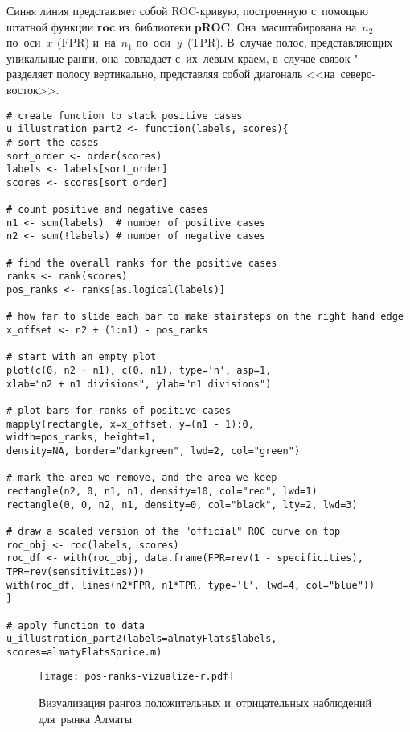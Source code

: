 \documentclass[]{scrreprt}
\begin{document}
Синяя линия представляет собой ROC-кривую, построенную с~помощью штатной функции \textbf{roc} из~библиотеки \textbf{pROC}. Она~масштабирована на~$n_{2}$ по~оси~\textit{x}~(FPR) и~на~$n_{1}$ по~оси~\textit{y}~(TPR). В~случае полос, представляющих уникальные ранги, она~совпадает с~их~левым краем, в~случае связок "--- разделяет полосу вертикально, представляя собой диагональ <<на~северо-восток>>.
%
\begin{lstlisting}[float, caption = Визуализация рангов положительных наблюдений для~рынка Алматы, firstnumber=1, label= lst:vizualize-pos-cases-almaty-R]
# create function to stack positive cases
u_illustration_part2 <- function(labels, scores){
# sort the cases
sort_order <- order(scores)
labels <- labels[sort_order]
scores <- scores[sort_order]

# count positive and negative cases
n1 <- sum(labels)  # number of positive cases
n2 <- sum(!labels) # number of negative cases

# find the overall ranks for the positive cases
ranks <- rank(scores)
pos_ranks <- ranks[as.logical(labels)]

# how far to slide each bar to make stairsteps on the right hand edge
x_offset <- n2 + (1:n1) - pos_ranks

# start with an empty plot  
plot(c(0, n2 + n1), c(0, n1), type='n', asp=1,
xlab="n2 + n1 divisions", ylab="n1 divisions")

# plot bars for ranks of positive cases
mapply(rectangle, x=x_offset, y=(n1 - 1):0, 
width=pos_ranks, height=1,
density=NA, border="darkgreen", lwd=2, col="green")

# mark the area we remove, and the area we keep
rectangle(n2, 0, n1, n1, density=10, col="red", lwd=1)
rectangle(0, 0, n2, n1, density=0, col="black", lty=2, lwd=3)

# draw a scaled version of the "official" ROC curve on top
roc_obj <- roc(labels, scores)
roc_df <- with(roc_obj, data.frame(FPR=rev(1 - specificities), 
TPR=rev(sensitivities)))
with(roc_df, lines(n2*FPR, n1*TPR, type='l', lwd=4, col="blue"))
}

# apply function to data
u_illustration_part2(labels=almatyFlats$labels, scores=almatyFlats$price.m)
\end{lstlisting}
%
\begin{figure}[ht]
	\centering
	\texttt{[image: pos-ranks-vizualize-r.pdf]}
	\caption{Визуализация рангов положительных и~отрицательных наблюдений для~рынка Алматы}
	\label{fig:pos-ranks-vizualize-r.pdf}
\end{figure}
%
\clearpage
\end{document}
